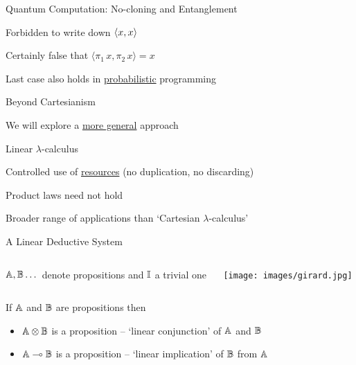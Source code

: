 \documentclass{beamer}
\def\pv#1#2{\langle #1 \rangle #2}
\begin{document}
\begin{frame}{Quantum Computation: No-cloning and Entanglement}

        Forbidden to write down $\pv{x,x}$

        \bigskip
        \pause
        Certainly false that $\pv{\pi_1 \, x, \pi_2 \, x} = x$


        \bigskip
        \pause
        Last case also holds in \alert{\underline{probabilistic}} programming
\end{frame}

\begin{frame}{Beyond Cartesianism}


        \bigskip
        We will explore a \alert{\underline{more general}} approach
\end{frame}

\begin{frame}{Linear $\lambda$-calculus}

        Controlled use of \alert{\underline{resources}}
        (no duplication, no discarding)

        \bigskip
        Product laws need not hold

        \bigskip
        Broader range of applications than `Cartesian $\lambda$-calculus'
\end{frame}

\begin{slide}{A Linear Deductive System}
  \begin{minipage}[1\textheight]{\textwidth}
  \begin{columns}[c]
  \begin{column}{0.75\textwidth}
          $\mathbb{A},\mathbb{B} \dots$ denote propositions
          and $\mathbb{I}$ a trivial one 
  \end{column}
  \begin{column}{0.18\textwidth}
        \texttt{[image: images/girard.jpg]}
  \end{column}
  \end{columns}
  \end{minipage}

  \vspace{-0.5cm}
  If $\mathbb{A}$ and $\mathbb{B}$ are propositions then
  \begin{itemize}
    \item $\mathbb{A} \otimes \mathbb{B}$ is a proposition -- 
        `linear conjunction' of $\mathbb{A}$ and $\mathbb{B}$
    \item $\mathbb{A} \multimap \mathbb{B}$ is a proposition -- 
            `linear implication' of $\mathbb{B}$ from $\mathbb{A}$
  \end{itemize}
  
\end{slide}
\end{document}
